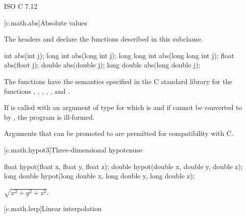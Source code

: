 \xref
ISO C 7.12

[c.math.abs]{Absolute values}

\pnum
\begin{note}
The headers  and
declare the functions described in this subclause.
\end{note}

%
\begin{itemdecl}
int abs(int j);
long int abs(long int j);
long long int abs(long long int j);
float abs(float j);
double abs(double j);
long double abs(long double j);
\end{itemdecl}

\begin{itemdescr}
\pnum
\effects
The 
functions have the semantics specified in the C standard library
for the functions , , ,
, , and .

\pnum
\remarks
If  is called with an argument of type 
for which  is  and
if  cannot be converted to 
by , the program is ill-formed.
\begin{note}
Arguments that can be promoted to  are permitted for compatibility with C.
\end{note}
\end{itemdescr}


[c.math.hypot3]{Three-dimensional hypotenuse}

%
\begin{itemdecl}
float hypot(float x, float y, float z);
double hypot(double x, double y, double z);
long double hypot(long double x, long double y, long double z);
\end{itemdecl}

\begin{itemdescr}
\pnum
\returns
$\sqrt{x^2+y^2+z^2}$.
\end{itemdescr}

[c.math.lerp]{Linear interpolation}

